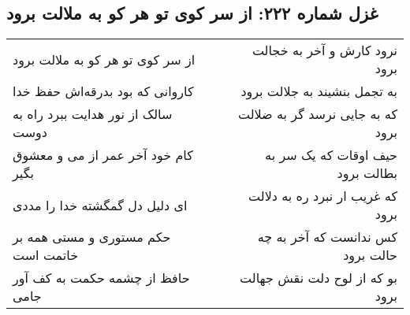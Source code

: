 \begin{center}
\section*{غزل شماره ۲۲۲: از سر کوی تو هر کو به ملالت برود}
\label{sec:sh222}
\begin{longtable}{l p{0.5cm} r}
از سر کوی تو هر کو به ملالت برود
&&
نرود کارش و آخر به خجالت برود
\\
کاروانی که بود بدرقه‌اش حفظ خدا
&&
به تجمل بنشیند به جلالت برود
\\
سالک از نور هدایت ببرد راه به دوست
&&
که به جایی نرسد گر به ضلالت برود
\\
کام خود آخر عمر از می و معشوق بگیر
&&
حیف اوقات که یک سر به بطالت برود
\\
ای دلیل دل گمگشته خدا را مددی
&&
که غریب ار نبرد ره به دلالت برود
\\
حکم مستوری و مستی همه بر خاتمت است
&&
کس ندانست که آخر به چه حالت برود
\\
حافظ از چشمه حکمت به کف آور جامی
&&
بو که از لوح دلت نقش جهالت برود
\\
\end{longtable}
\end{center}
